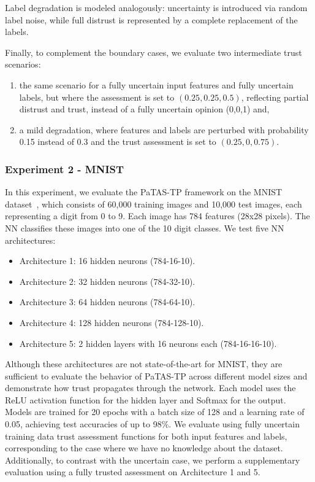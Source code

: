 \noindent Label degradation is modeled analogously: uncertainty is introduced via random label noise, while full distrust is represented by a complete replacement of the labels.

Finally, to complement the boundary cases, we evaluate two intermediate trust scenarios: 
\begin{enumerate}[\roman*.]
    \item the same scenario for a fully uncertain input features and fully uncertain labels, but where the assessment is set to \((0.25, 0.25, 0.5)\), reflecting partial distrust and trust, instead of a fully uncertain opinion (0,0,1) and,
    \item a mild degradation, where features and labels are perturbed with probability 0.15 instead of 0.3 and the trust assessment is set to \((0.25, 0, 0.75)\).

\end{enumerate}

\subsubsection{Experiment 2 - MNIST}\label{exp:2}

In this experiment, we evaluate the \ac{PaTAS-TP} framework on the MNIST dataset~\cite{lecun1998mnist}, which consists of 60,000 training images and 10,000 test images, each representing a digit from 0 to 9. Each image has 784 features (28x28 pixels). The \ac{NN} classifies these images into one of the 10 digit classes. We test five \ac{NN} architectures:
\begin{itemize}
    \item Architecture 1: 16 hidden neurons (784-16-10).
    \item Architecture 2: 32 hidden neurons (784-32-10).
    \item Architecture 3: 64 hidden neurons (784-64-10).
    \item Architecture 4: 128 hidden neurons (784-128-10).
    \item Architecture 5: 2 hidden layers with 16 neurons each (784-16-16-10).
\end{itemize}
Although these architectures are not state-of-the-art for MNIST, they are sufficient to evaluate the behavior of \ac{PaTAS-TP} across different model sizes and demonstrate how trust propagates through the network. Each model uses the ReLU activation function for the hidden layer and Softmax for the output. Models are trained for 20 epochs with a batch size of 128 and a learning rate of 0.05, achieving test accuracies of up to 98\%. We evaluate using fully uncertain training data trust assessment functions for both input features and labels, corresponding to the case where we have no knowledge about the dataset.  Additionally, to contrast with the uncertain case, we perform a supplementary evaluation using a fully trusted assessment on Architecture 1 and 5.

